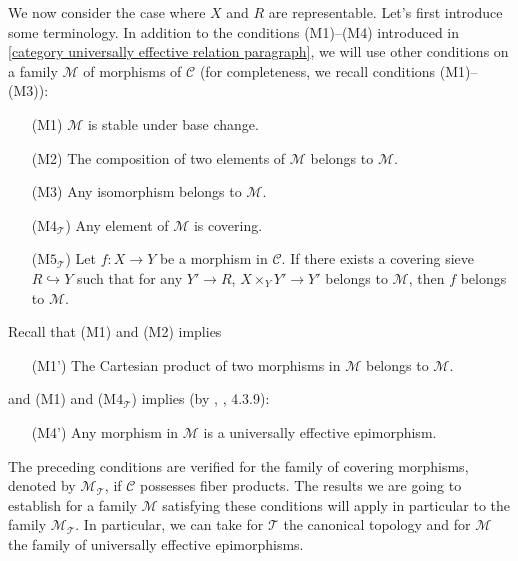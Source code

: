 We now consider the case where $X$ and $R$ are representable. Let's first introduce some terminology. In addition to the conditions (M1)--(M4) introduced in \ref{category universally effective relation paragraph}, we will use other conditions on a family $\mathcal{M}$ of morphisms of $\mathcal{C}$ (for completeness, we recall conditions (M1)--(M3)):
\begin{enumerate}[leftmargin=40pt]
    \item[(M1)] $\mathcal{M}$ is stable under base change.
    \item[(M2)] The composition of two elements of $\mathcal{M}$ belongs to $\mathcal{M}$.
    \item[(M3)] Any isomorphism belongs to $\mathcal{M}$.
    \item[($\text{M4}_\mathcal{T}$)] Any element of $\mathcal{M}$ is covering.
    \item[($\text{M5}_\mathcal{T}$)] Let $f:X\to Y$ be a morphism in $\mathcal{C}$. If there exists a covering sieve $R\hookrightarrow Y$ such that for any $Y'\to R$, $X\times_YY'\to Y'$ belongs to $\mathcal{M}$, then $f$ belongs to $\mathcal{M}$.
\end{enumerate}
Recall that (M1) and (M2) implies
\begin{enumerate}[leftmargin=40pt]
    \item[(M1')] The Cartesian product of two morphisms in $\mathcal{M}$ belongs to $\mathcal{M}$.
\end{enumerate}
and (M1) and ($\text{M4}_\mathcal{T}$) implies (by \cite{SGA3-1}, , 4.3.9):
\begin{enumerate}[leftmargin=40pt]
    \item[(M4')] Any morphism in $\mathcal{M}$ is a universally effective epimorphism.
\end{enumerate}

The preceding conditions are verified for the family of covering morphisms, denoted by $\mathcal{M}_\mathcal{T}$, if $\mathcal{C}$ possesses fiber products. The results we are going to establish for a family $\mathcal{M}$ satisfying these conditions will apply in particular to the family $\mathcal{M}_\mathcal{T}$. In particular, we can take for $\mathcal{T}$ the canonical topology and for $\mathcal{M}$ the family of universally effective epimorphisms.

